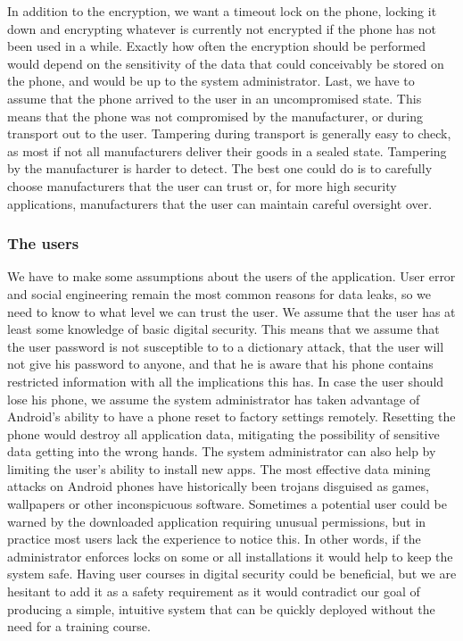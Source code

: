 In addition to the encryption, we want a timeout lock on the phone, locking it down and encrypting whatever is currently not encrypted if the phone has not been used in a while. Exactly how often the encryption should be performed would depend on the sensitivity of the data that could conceivably be stored on the phone, and would be up to the system administrator.
Last, we have to assume that the phone arrived to the user in an uncompromised state. This means that the phone was not compromised by the manufacturer, or during transport out to the user. Tampering during transport is generally easy to check, as most if not all manufacturers deliver their goods in a sealed state. Tampering by the manufacturer is harder to detect. The best one could do is to carefully choose manufacturers that the user can trust or, for more high security applications, manufacturers that the user can maintain careful oversight over.

\subsubsection{The users}
We have to make some assumptions about the users of the application. User error and social engineering remain the most common reasons for data leaks, so we need to know to what level we can trust the user.
\newline
\newline
We assume that the user has at least some knowledge of basic digital security. This means that we assume that the user password is not susceptible to to a dictionary attack, that the user will not give his password to anyone, and that he is aware that his phone contains restricted information with all the implications this has. 
\newline
\newline
In case the user should lose his phone, we assume the system administrator has taken advantage of Android’s ability to have a phone reset to factory settings remotely. Resetting the phone would destroy all application data, mitigating the possibility of sensitive data getting into the wrong hands.
\newline
\newline
The system administrator can also help by limiting the user’s ability to install new apps. The most effective data mining attacks on Android phones have historically been trojans disguised as games, wallpapers or other inconspicuous software. Sometimes a potential user could be warned by the downloaded application requiring unusual permissions, but in practice most users lack the experience to notice this. In other words, if the administrator enforces locks on some or all installations it would help to keep the system safe.
\newline
\newline
Having user courses in digital security could be beneficial, but we are hesitant to add it as a safety requirement as it would contradict our goal of producing a simple, intuitive system that can be quickly deployed without the need for a training course. 

